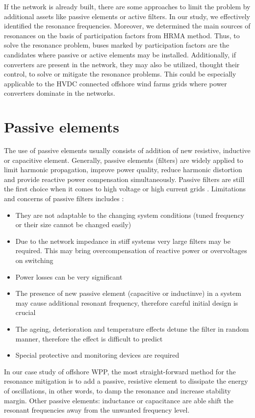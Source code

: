 \documentclass[a4paper,11pt,oneside]{report} %
\begin{document}
If the network is already built, there are some approaches to limit the problem by additional assets like passive elements or active filters. In our study, we effectively identified the resonance frequencies. Moreover, we determined the main sources of resonances on the basis of participation factors from HRMA method. Thus, to solve the resonance problem, buses marked by participation factors are the candidates where passive or active elements may be installed. Additionally, if converters are present in the network, they may also be utilized, thought their control, to solve or mitigate the resonance problems. This could be especially applicable to the HVDC connected offshore wind farms grids where power converters dominate in the networks.

\section{Passive elements}
The use of passive elements usually consists of addition of new resistive, inductive or capacitive element. Generally, passive elements (filters) are widely applied to limit harmonic propagation, improve power quality, reduce harmonic distortion and provide reactive power compensation simultaneously. Passive filters are still the first choice when it comes to high voltage or high current grids \cite{das}. Limitations and concerns of passive filters includes \cite{das}:
\begin{itemize}
	\item They are not adaptable to the changing system conditions (tuned frequency or their size cannot be changed easily)
	\item Due to the network impedance in stiff systems very large filters may be required. This may bring overcompensation of reactive power or overvoltages on switching
	\item Power losses can be very significant
	\item The presence of new passive element (capacitive or inductinve) in a system may cause additional resonant frequency, therefore careful initial design is crucial
	\item The ageing, deterioration and temperature effects detune the filter in random manner, therefore the effect is difficult to predict
	\item Special protective and monitoring devices are required
\end{itemize}

In our case study of offshore WPP, the most straight-forward method for the resonance mitigation is to add a passive, resistive element to dissipate the energy of oscillations, in other words, to damp the resonance and increase stability margin. Other passive elements: inductance or capacitance are able shift the resonant frequencies away from the unwanted frequency level.
\end{document}
